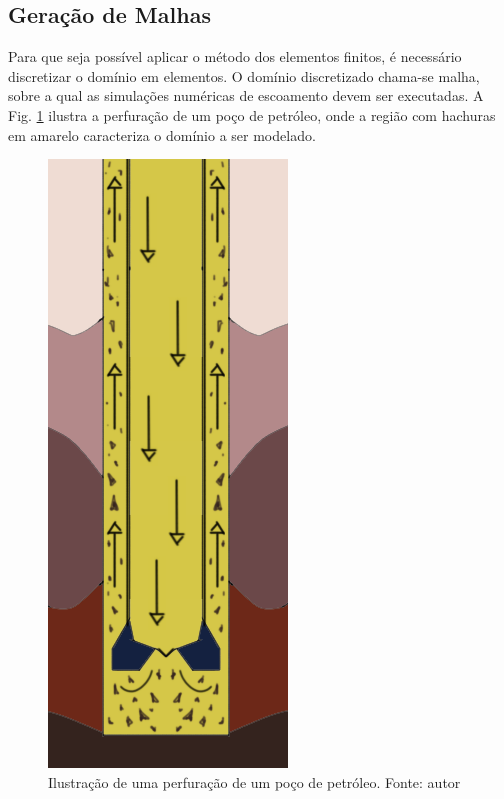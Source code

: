 \subsection{Geração de Malhas}

Para que seja possível aplicar o método dos elementos finitos, é necessário discretizar o domínio em elementos. O domínio discretizado  chama-se malha, sobre a qual as simulações numéricas de escoamento devem ser executadas. A Fig. \ref{fig:perfuracao} ilustra a perfuração de um poço de petróleo, onde a região com hachuras em amarelo caracteriza o domínio a ser modelado.
\begin{figure}[H]
	\centering
	\includegraphics[scale=0.6]{img/broca.png}
	\caption[Ilustração de uma perfuração de um poço de petróleo.]{Ilustração de uma perfuração de um poço de petróleo. Fonte: autor}
	\label{fig:perfuracao}
\end{figure}


